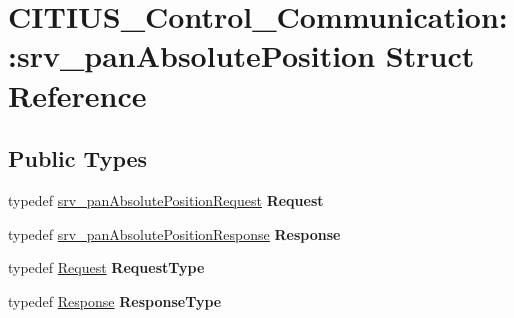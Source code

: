 \hypertarget{struct_c_i_t_i_u_s___control___communication_1_1srv__pan_absolute_position}{\section{\-C\-I\-T\-I\-U\-S\-\_\-\-Control\-\_\-\-Communication\-:\-:srv\-\_\-pan\-Absolute\-Position \-Struct \-Reference}
\label{struct_c_i_t_i_u_s___control___communication_1_1srv__pan_absolute_position}
}
\subsection*{\-Public \-Types}
\begin{DoxyCompactItemize}
\item 
\hypertarget{struct_c_i_t_i_u_s___control___communication_1_1srv__pan_absolute_position_a132af4ee3f82a5fe7c1c7d0701d3de90}{typedef \*
\hyperlink{struct_c_i_t_i_u_s___control___communication_1_1srv__pan_absolute_position_request__}{srv\-\_\-pan\-Absolute\-Position\-Request} {\bfseries \-Request}}\label{struct_c_i_t_i_u_s___control___communication_1_1srv__pan_absolute_position_a132af4ee3f82a5fe7c1c7d0701d3de90}

\item 
\hypertarget{struct_c_i_t_i_u_s___control___communication_1_1srv__pan_absolute_position_a05d4bccd3011348f278e4a73bfa9c620}{typedef \*
\hyperlink{struct_c_i_t_i_u_s___control___communication_1_1srv__pan_absolute_position_response__}{srv\-\_\-pan\-Absolute\-Position\-Response} {\bfseries \-Response}}\label{struct_c_i_t_i_u_s___control___communication_1_1srv__pan_absolute_position_a05d4bccd3011348f278e4a73bfa9c620}

\item 
\hypertarget{struct_c_i_t_i_u_s___control___communication_1_1srv__pan_absolute_position_a390ddf6ae655b16ba785914ed5a5323f}{typedef \hyperlink{struct_c_i_t_i_u_s___control___communication_1_1srv__pan_absolute_position_request__}{\-Request} {\bfseries \-Request\-Type}}\label{struct_c_i_t_i_u_s___control___communication_1_1srv__pan_absolute_position_a390ddf6ae655b16ba785914ed5a5323f}

\item 
\hypertarget{struct_c_i_t_i_u_s___control___communication_1_1srv__pan_absolute_position_ac244a5f81ac80497020277d9e2ecace7}{typedef \hyperlink{struct_c_i_t_i_u_s___control___communication_1_1srv__pan_absolute_position_response__}{\-Response} {\bfseries \-Response\-Type}}\label{struct_c_i_t_i_u_s___control___communication_1_1srv__pan_absolute_position_ac244a5f81ac80497020277d9e2ecace7}

\end{DoxyCompactItemize}
